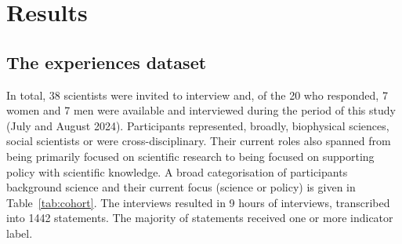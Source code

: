 \chapter{Results}\label{ch:results}

\section{The experiences dataset}\label{sec:resdataset}
In total, 38 scientists were invited to interview and, of the 20 who responded, 7 women and 7 men were available and interviewed during the period of this study (July and August 2024). Participants represented, broadly, biophysical sciences, social scientists or were cross-disciplinary. Their current roles also spanned from being primarily focused on scientific research to being focused on supporting policy with scientific knowledge.  A broad categorisation of participants background science and their current focus (science or policy) is given in Table~\ref{tab:cohort}. The interviews resulted in 9\textonehalf{} hours of interviews, transcribed into 1442 statements. The majority of statements received one or more indicator label.


